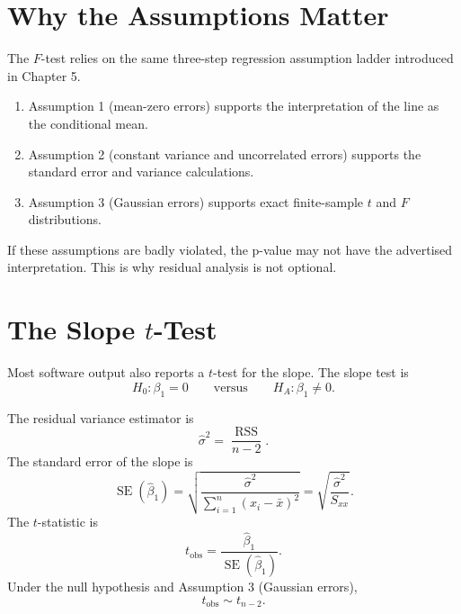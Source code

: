 \section{Why the Assumptions Matter}

The $F$-test relies on the same three-step regression assumption ladder introduced in Chapter 5.

\begin{enumerate}
  \item Assumption 1 (mean-zero errors) supports the interpretation of the line as the conditional mean.
  \item Assumption 2 (constant variance and uncorrelated errors) supports the standard error and variance calculations.
  \item Assumption 3 (Gaussian errors) supports exact finite-sample $t$ and $F$ distributions.
\end{enumerate}

If these assumptions are badly violated, the p-value may not have the advertised interpretation.  This is why residual analysis is not optional.

\section{The Slope \texorpdfstring{$t$}{t}-Test}

Most software output also reports a $t$-test for the slope.  The slope test is
\begin{equation}
  H_0:\beta_1=0
  \qquad\text{versus}\qquad
  H_A:\beta_1\neq 0.
\end{equation}

The residual variance estimator is
\begin{equation}
  \widehat{\sigma}^2=\frac{\operatorname{RSS}}{n-2}.
  \label{eq:ch6-sigmahat}
\end{equation}
The standard error of the slope is
\begin{equation}
  \operatorname{SE}(\widehat{\beta}_1)
  =\sqrt{\frac{\widehat{\sigma}^2}{\sum_{i=1}^n (x_i-\bar{x})^2}}
  =\sqrt{\frac{\widehat{\sigma}^2}{S_{xx}}}.
  \label{eq:ch6-se-beta1}
\end{equation}
The $t$-statistic is
\begin{equation}
  t_{\text{obs}}=\frac{\widehat{\beta}_1}{\operatorname{SE}(\widehat{\beta}_1)}.
  \label{eq:ch6-t-stat}
\end{equation}
Under the null hypothesis and Assumption 3 (Gaussian errors),
\begin{equation}
  t_{\text{obs}}\sim t_{n-2}.
\end{equation}

